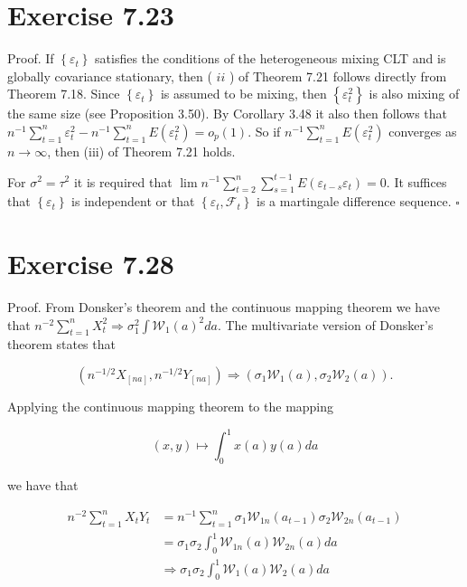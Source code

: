 \documentclass[10pt]{article}
\begin{document}
\section*{Exercise 7.23}
Proof. If $\left\{\varepsilon_{t}\right\}$ satisfies the conditions of the heterogeneous mixing CLT and is globally covariance stationary, then ( $i i$ ) of Theorem 7.21 follows directly from Theorem 7.18. Since $\left\{\varepsilon_{t}\right\}$ is assumed to be mixing, then $\left\{\varepsilon_{t}^{2}\right\}$ is also mixing of the same size (see Proposition 3.50). By Corollary 3.48 it also then follows that $n^{-1} \sum_{t=1}^{n} \varepsilon_{t}^{2}-n^{-1} \sum_{t=1}^{n} E\left(\varepsilon_{t}^{2}\right)=o_{p}(1)$. So if $n^{-1} \sum_{t=1}^{n} E\left(\varepsilon_{t}^{2}\right)$ converges as $n \rightarrow \infty$, then (iii) of Theorem 7.21 holds.

For $\sigma^{2}=\tau^{2}$ it is required that $\lim n^{-1} \sum_{t=2}^{n} \sum_{s=1}^{t-1} E\left(\varepsilon_{t-s} \varepsilon_{t}\right)=0$. It suffices that $\left\{\varepsilon_{t}\right\}$ is independent or that $\left\{\varepsilon_{t}, \mathcal{F}_{t}\right\}$ is a martingale difference sequence. \(\square\)

\section*{Exercise 7.28}
Proof. From Donsker's theorem and the continuous mapping theorem we have that $n^{-2} \sum_{t=1}^{n} X_{t}^{2} \Rightarrow \sigma_{1}^{2} \int \mathcal{W}_{1}(a)^{2} d a$. The multivariate version of Donsker's theorem states that

$$
\left(n^{-1 / 2} X_{[n a]}, n^{-1 / 2} Y_{[n a]}\right) \Rightarrow\left(\sigma_{1} \mathcal{W}_{1}(a), \sigma_{2} \mathcal{W}_{2}(a)\right) .
$$

Applying the continuous mapping theorem to the mapping

$$
(x, y) \mapsto \int_{0}^{1} x(a) y(a) d a
$$

we have that

$$
\begin{aligned}
n^{-2} \sum_{t=1}^{n} X_{t} Y_{t} & =n^{-1} \sum_{t=1}^{n} \sigma_{1} \mathcal{W}_{1 n}\left(a_{t-1}\right) \sigma_{2} \mathcal{W}_{2 n}\left(a_{t-1}\right) \\
& =\sigma_{1} \sigma_{2} \int_{0}^{1} \mathcal{W}_{1 n}(a) \mathcal{W}_{2 n}(a) d a \\
& \Rightarrow \sigma_{1} \sigma_{2} \int_{0}^{1} \mathcal{W}_{1}(a) \mathcal{W}_{2}(a) d a
\end{aligned}
$$
\end{document}
